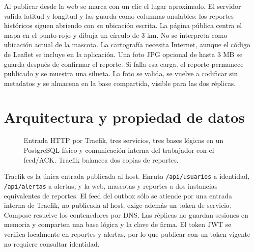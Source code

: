 \documentclass[11pt,letterpaper]{article}
\begin{document}
Al publicar desde la web se marca con un clic el lugar aproximado. El servidor valida latitud y longitud y las guarda como columnas anulables: los reportes históricos siguen abriendo con su ubicación escrita. La página pública centra el mapa en el punto rojo y dibuja un círculo de 3 km. No se interpreta como ubicación actual de la mascota. La cartografía necesita Internet, aunque el código de Leaflet se incluye en la aplicación. Una foto JPG opcional de hasta 3 MB se guarda después de confirmar el reporte. Si falla esa carga, el reporte permanece publicado y se muestra una silueta. La foto se valida, se vuelve a codificar sin metadatos y se almacena en la base compartida, visible para las dos réplicas.

\section{Arquitectura y propiedad de datos}
\begin{figure}[H]\centering
{}
\caption{Entrada HTTP por Traefik, tres servicios, tres bases lógicas en un PostgreSQL físico y comunicación interna del trabajador con el feed/ACK. Traefik balancea dos copias de reportes.}
\end{figure}
Traefik es la única entrada publicada al host. Enruta \texttt{/api/usuarios} a identidad, \texttt{/api/alertas} a alertas, y la web, mascotas y reportes a dos instancias equivalentes de reportes. El feed del outbox sólo se atiende por una entrada interna de Traefik, no publicada al host; exige además un token de servicio. Compose resuelve los contenedores por DNS. Las réplicas no guardan sesiones en memoria y comparten una base lógica y la clave de firma. El token JWT se verifica localmente en reportes y alertas, por lo que publicar con un token vigente no requiere consultar identidad.
\end{document}

